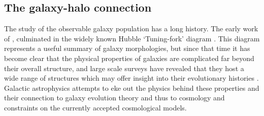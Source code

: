 \subsection{The galaxy-halo connection}
\label{sec:galaxyhaloconnect}
The study of the observable galaxy population has a long history. The early work of \citet{1926ApJ....64..321H}, culminated in the widely known Hubble `Tuning-fork' diagram \citep[e.g.][]{1936rene.book.....H,1961hag..book.....S}. This diagram represents a useful summary of galaxy morphologies, but since that time it has become clear that the physical properties of galaxies are complicated far beyond their overall structure, and large scale surveys have revealed that they host a wide range of structures which may offer insight into their evolutionary histories \citep[e.g.][]{2009ARA&A..47..159B}. Galactic astrophysics attempts to eke out the physics behind these properties and their connection to galaxy evolution theory and thus to cosmology and constraints on the currently accepted cosmological models. 

